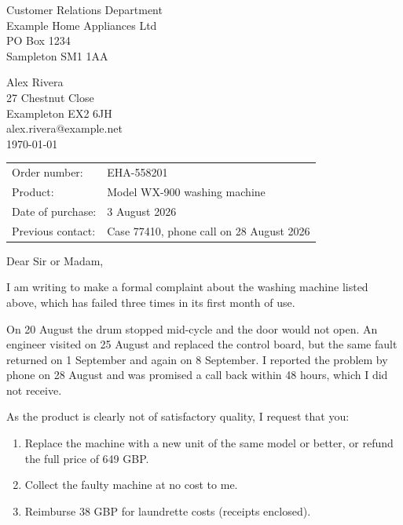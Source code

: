 \documentclass[11pt]{article}
\begin{document}
\begin{minipage}[t]{0.48\textwidth}
  Customer Relations Department\\
  Example Home Appliances Ltd\\
  PO Box 1234\\
  Sampleton SM1 1AA
\end{minipage}\hfill
\begin{minipage}[t]{0.42\textwidth}
  \raggedleft
  Alex Rivera\\
  27 Chestnut Close\\
  Exampleton EX2 6JH\\
  alex.rivera@example.net\\[1em]
  \today
\end{minipage}

\vspace{1.5em}
\begin{tcolorbox}[enhanced,colback=white,colframe=alert,boxrule=0.8pt,arc=2pt,
  title={\bfseries Formal complaint: faulty washing machine},coltitle=white,colbacktitle=alert]
  \begin{tabular}{@{}ll@{}}
    Order number: & EHA-558201 \\
    Product: & Model WX-900 washing machine \\
    Date of purchase: & 3 August 2026 \\
    Previous contact: & Case 77410, phone call on 28 August 2026 \\
  \end{tabular}
\end{tcolorbox}

Dear Sir or Madam,

I am writing to make a formal complaint about the washing machine listed above, which has failed three times in its first month of use.

On 20 August the drum stopped mid-cycle and the door would not open. An engineer visited on 25 August and replaced the control board, but the same fault returned on 1 September and again on 8 September. I reported the problem by phone on 28 August and was promised a call back within 48 hours, which I did not receive.

As the product is clearly not of satisfactory quality, I request that you:
\begin{enumerate}[label=\textbf{\arabic*.},leftmargin=2em]
  \item Replace the machine with a new unit of the same model or better, or refund the full price of 649 GBP.
  \item Collect the faulty machine at no cost to me.
  \item Reimburse 38 GBP for laundrette costs (receipts enclosed).
\end{enumerate}
\end{document}

